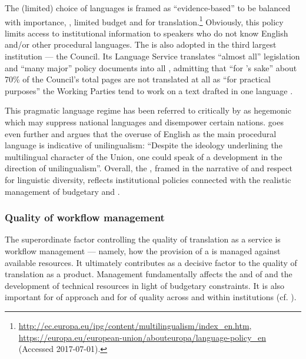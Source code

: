 \documentclass[output=paper]{langsci/langscibook}
\begin{document}
The (limited) choice of languages is framed as “evidence-based'' to be balanced with importance, , limited budget and  for translation.\footnote{\url{http://ec.europa.eu/ipg/content/multilingualism/index_en.htm}, \url{https://europa.eu/european-union/abouteuropa/language-policy_en} (Accessed 2017-07-01).}
\largerpage
Obviously, this policy limits access to institutional information to speakers who do not know English and/or other procedural languages. The  is also adopted in the third largest  institution — the Council. Its Language Service translates “almost all” legislation and “many major” policy documents into all , admitting that “for ’s sake” about 70\% of the Council’s total pages are not translated at all as “for practical purposes” the Working Parties tend to work on a text drafted in one language \citep[8]{GSC2012}.

This pragmatic language regime has been referred to critically by \citet{Krzyżanowski2011} as hegemonic  which may suppress national languages and disempower certain nations. \citet[33]{Mattila2013} goes even further and argues that the overuse of English as the main procedural language is indicative of unilingualism: “Despite the ideology underlining the multilingual character of the Union, one could speak of a development in the direction of unilingualism”. Overall, the , framed in the narrative of  and respect for linguistic diversity, reflects institutional policies connected with the realistic management of budgetary and . 

\subsubsection{Quality of workflow management}\label{sec:biel:3.2.2}

The superordinate factor controlling the quality of translation as a service is workflow management — namely, how the provision of a  is managed against available resources. It ultimately contributes as a decisive factor to the quality of translation as a product. Management fundamentally affects the  and  of  and the development of technical resources in light of budgetary constraints. It is also important for  of approach and for  of quality across and within institutions (cf. \citealt{Druganforthcoming}). 
\end{document}
